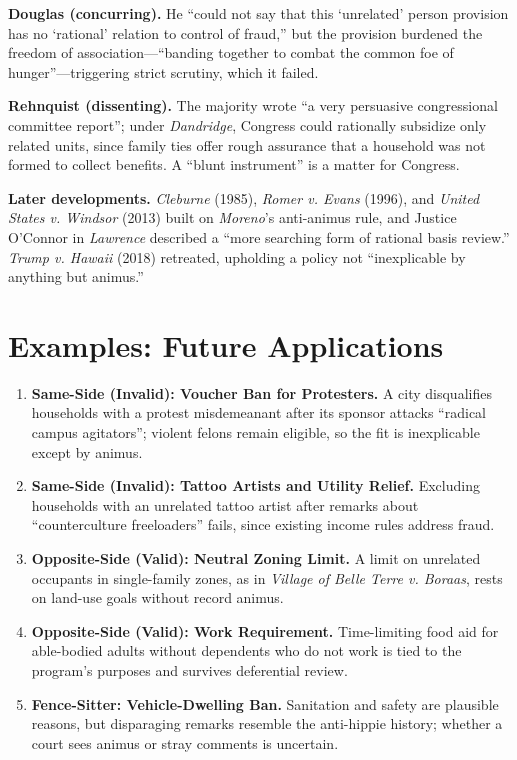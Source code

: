 \documentclass[12pt]{article}
\begin{document}
\textbf{Douglas (concurring).} He ``could not say that this `unrelated' person provision has no `rational' relation to control of fraud,'' but the provision burdened the freedom of association---``banding together to combat the common foe of hunger''---triggering strict scrutiny, which it failed.

\textbf{Rehnquist (dissenting).} The majority wrote ``a very persuasive congressional committee report''; under \textit{Dandridge}, Congress could rationally subsidize only related units, since family ties offer rough assurance that a household was not formed to collect benefits. A ``blunt instrument'' is a matter for Congress.

\textbf{Later developments.} \textit{Cleburne} (1985), \textit{Romer v. Evans} (1996), and \textit{United States v. Windsor} (2013) built on \textit{Moreno}'s anti-animus rule, and Justice O'Connor in \textit{Lawrence} described a ``more searching form of rational basis review.'' \textit{Trump v. Hawaii} (2018) retreated, upholding a policy not ``inexplicable by anything but animus.''

\section{Examples: Future Applications}

\begin{enumerate}
\item \textbf{Same-Side (Invalid): Voucher Ban for Protesters.} A city disqualifies households with a protest misdemeanant after its sponsor attacks ``radical campus agitators''; violent felons remain eligible, so the fit is inexplicable except by animus.
\item \textbf{Same-Side (Invalid): Tattoo Artists and Utility Relief.} Excluding households with an unrelated tattoo artist after remarks about ``counterculture freeloaders'' fails, since existing income rules address fraud.
\item \textbf{Opposite-Side (Valid): Neutral Zoning Limit.} A limit on unrelated occupants in single-family zones, as in \textit{Village of Belle Terre v. Boraas}, rests on land-use goals without record animus.
\item \textbf{Opposite-Side (Valid): Work Requirement.} Time-limiting food aid for able-bodied adults without dependents who do not work is tied to the program's purposes and survives deferential review.
\item \textbf{Fence-Sitter: Vehicle-Dwelling Ban.} Sanitation and safety are plausible reasons, but disparaging remarks resemble the anti-hippie history; whether a court sees animus or stray comments is uncertain.
\end{enumerate}
\end{document}
